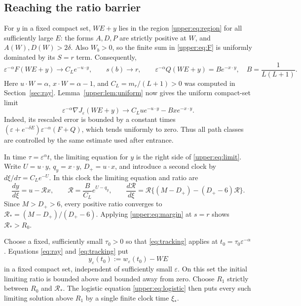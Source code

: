 \documentclass[11pt]{article}
\newcommand{\eps}{\varepsilon}\newcommand{\R}{\mathbb R}
\begin{document}
\subsection{Reaching the ratio barrier}
For $y$ in a fixed compact set, $WE+y$ lies in the region
\eqref{upper:eq:region} for all sufficiently large $E$: the forms $A,D,P$
are strictly positive at $W$, and $A(W),D(W)>2\delta$. Also $W_b>0$, so
the finite sum in \eqref{upper:eq:F} is uniformly dominated by its $S=r$
term. Consequently,
\[
 \eps^{-\alpha}F(WE+y)\to C_Le^{-u\cdot y},\qquad s(b)\to r,
 \qquad \eps^{-\alpha}Q(WE+y)=Be^{-x\cdot y},
 \quad B=\frac1{L(L+1)}.
\]
Here $u\cdot W=\alpha$, $x\cdot W=\alpha-1$, and
$C_L=m_r/(L+1)>0$ was computed in Section~\ref{sec:ray}.
Lemma~\ref{upper:lem:uniform} now gives the uniform compact-set limit
\begin{equation}\label{upper:eq:limit}
 \eps^{-\alpha}\nabla J_\eps(WE+y)
 \longrightarrow C_Lu e^{-u\cdot y}-Bxe^{-x\cdot y}.
\end{equation}
Indeed, its rescaled error is bounded by a constant times
$(\eps+e^{-\delta E})\eps^{-\alpha}(F+Q)$, which tends uniformly to zero.
Thus all path classes are controlled by the same estimate used after entrance.

In time $\tau=\eps^\alpha t$, the limiting equation for $y$ is the right
side of \eqref{upper:eq:limit}. Write $U=u\cdot y$, $q_y=x\cdot y$,
$D_+=u\cdot x$, and introduce a second clock by
$d\xi/d\tau=C_Le^{-U}$. In this clock the limiting equation and ratio are
\begin{equation}\label{upper:eq:logistic}
 \frac{dy}{d\xi}=u-\mathcal R x,\qquad
 \mathcal R=\frac B{C_L}e^{U-q_y},\qquad
 \frac{d\mathcal R}{d\xi}
 =\mathcal R\{(M-D_+)-(D_+-6)\mathcal R\}.
\end{equation}
Since $M>D_+>6$, every positive ratio converges to
$\mathcal R_*=(M-D_+)/(D_+-6)$. Applying \eqref{upper:eq:margin} at $s=r$ shows $\mathcal R_*>R_0$.

Choose a fixed, sufficiently small $\tau_0>0$ so that \eqref{eq:tracking}
applies at $t_0=\tau_0\eps^{-\alpha}$. Equations \eqref{eq:ray} and
\eqref{eq:tracking} put
\[
 y_\eps(t_0):=w_\eps(t_0)-WE
\]
in a fixed compact set, independent of sufficiently small $\eps$.
On this set the initial limiting ratio is bounded above and bounded away
from zero. Choose $R_1$ strictly between $R_0$ and $\mathcal R_*$.
The logistic equation \eqref{upper:eq:logistic} then puts every such limiting
solution above $R_1$ by a single finite clock time $\xi_*$.
\end{document}
